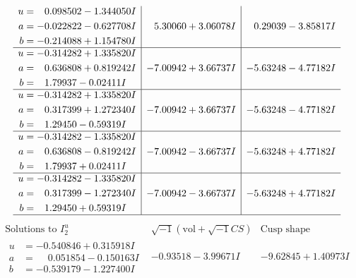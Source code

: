 \documentclass[1p]{elsarticle_modified}
\theoremstyle{definition}
\newcommand{\I}{\sqrt{-1}}
\begin{document}
$$\begin{array}{c|c|c}
\begin{aligned}
u &= \phantom{-}0.098502 - 1.344050 I \\
a &= -0.022822 - 0.627708 I \\
b &= -0.214088 + 1.154780 I\end{aligned}
 & \phantom{-}5.30060 + 3.06078 I & \phantom{-}0.29039 - 3.85817 I \\ \hline\begin{aligned}
u &= -0.314282 + 1.335820 I \\
a &= \phantom{-}0.636808 + 0.819242 I \\
b &= \phantom{-}1.79937 - 0.02411 I\end{aligned}
 & -7.00942 + 3.66737 I & -5.63248 - 4.77182 I \\ \hline\begin{aligned}
u &= -0.314282 + 1.335820 I \\
a &= \phantom{-}0.317399 + 1.272340 I \\
b &= \phantom{-}1.29450 - 0.59319 I\end{aligned}
 & -7.00942 + 3.66737 I & -5.63248 - 4.77182 I \\ \hline\begin{aligned}
u &= -0.314282 - 1.335820 I \\
a &= \phantom{-}0.636808 - 0.819242 I \\
b &= \phantom{-}1.79937 + 0.02411 I\end{aligned}
 & -7.00942 - 3.66737 I & -5.63248 + 4.77182 I \\ \hline\begin{aligned}
u &= -0.314282 - 1.335820 I \\
a &= \phantom{-}0.317399 - 1.272340 I \\
b &= \phantom{-}1.29450 + 0.59319 I\end{aligned}
 & -7.00942 - 3.66737 I & -5.63248 + 4.77182 I\\
 \hline 
 \end{array}$$\newpage$$\begin{array}{c|c|c}  
\text{Solutions to }I^u_{2}& \I (\text{vol} + \sqrt{-1}CS) & \text{Cusp shape}\\
 \hline 
\begin{aligned}
u &= -0.540846 + 0.315918 I \\
a &= \phantom{-}0.051854 - 0.150163 I \\
b &= -0.539179 - 1.227400 I\end{aligned}
 & -0.93518 - 3.99671 I & -9.62845 + 1.40973 I \\ \hline\begin{aligned}

\end{aligned}
\end{array}$$
\end{document}
